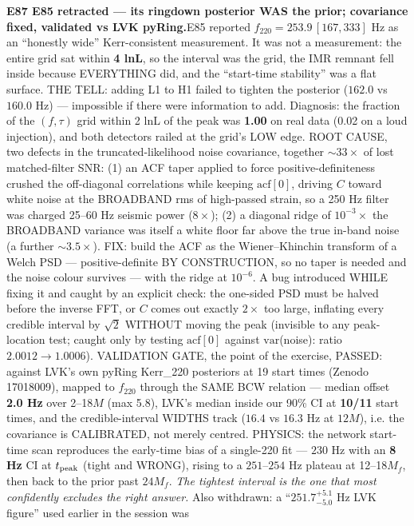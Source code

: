 \documentclass[10pt]{article}
\newcommand{\entry}[2]{\vspace{5pt}\noindent\textbf{#1}\quad #2\par}
\begin{document}
\entry{E87 E85 retracted --- its ringdown posterior WAS the prior; covariance fixed, validated vs LVK
pyRing.}{E85 reported $f_{220}=253.9\,[167,333]$ Hz as an ``honestly wide'' Kerr-consistent measurement. It
was not a measurement: the entire grid sat within \textbf{4 lnL}, so the interval was the grid, the IMR
remnant fell inside because EVERYTHING did, and the ``start-time stability'' was a flat surface. THE TELL:
adding L1 to H1 failed to tighten the posterior ($162.0$ vs $160.0$ Hz) --- impossible if there were
information to add. Diagnosis: the fraction of the $(f,\tau)$ grid within 2 lnL of the peak was
\textbf{1.00} on real data (0.02 on a loud injection), and both detectors railed at the grid's LOW edge.
ROOT CAUSE, two defects in the truncated-likelihood noise covariance, together ${\sim}33\times$ of lost
matched-filter SNR: (1) an ACF taper applied to force positive-definiteness crushed the off-diagonal
correlations while keeping $\mathrm{acf}[0]$, driving $C$ toward white noise at the BROADBAND rms of
high-passed strain, so a 250 Hz filter was charged 25--60 Hz seismic power ($8\times$); (2) a diagonal
ridge of $10^{-3}\times$ the BROADBAND variance was itself a white floor far above the true in-band noise
(a further ${\sim}3.5\times$). FIX: build the ACF as the Wiener--Khinchin transform of a Welch PSD ---
positive-definite BY CONSTRUCTION, so no taper is needed and the noise colour survives --- with the ridge
at $10^{-6}$. A bug introduced WHILE fixing it and caught by an explicit check: the one-sided PSD must be
halved before the inverse FFT, or $C$ comes out exactly $2\times$ too large, inflating every credible
interval by $\sqrt{2}$ WITHOUT moving the peak (invisible to any peak-location test; caught only by
testing $\mathrm{acf}[0]$ against $\mathrm{var}$(noise): ratio $2.0012\to1.0006$). VALIDATION GATE, the
point of the exercise, PASSED: against LVK's own pyRing Kerr\_220 posteriors at 19 start times (Zenodo
17018009), mapped to $f_{220}$ through the SAME BCW relation --- median offset \textbf{2.0 Hz} over
2--18$M$ (max 5.8), LVK's median inside our 90\% CI at \textbf{10/11} start times, and the credible-interval
WIDTHS track ($16.4$ vs $16.3$ Hz at $12M$), i.e. the covariance is CALIBRATED, not merely centred.
PHYSICS: the network start-time scan reproduces the early-time bias of a single-220 fit --- $230$ Hz with
an \textbf{8 Hz} CI at $t_{\rm peak}$ (tight and WRONG), rising to a $251$--$254$ Hz plateau at 12--18$M_f$,
then back to the prior past $24M_f$. \emph{The tightest interval is the one that most confidently excludes
the right answer.} Also withdrawn: a ``$251.7^{+5.1}_{-5.0}$ Hz LVK figure'' used earlier in the session was
}
\end{document}
